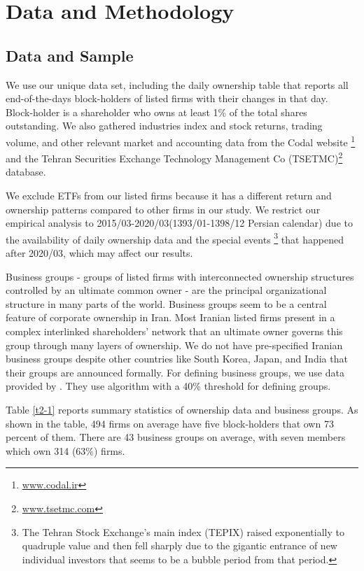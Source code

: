 
\section{{Data and Methodology}}



\subsection{{Data and Sample}}


We  use our unique data set, including the daily ownership table that reports all end-of-the-days block-holders of listed firms with their changes in that day.  Block-holder is a shareholder who owns at least 1\% of the total shares outstanding. 
	We also gathered industries index and stock returns, trading volume, and other relevant market and accounting data from the Codal website \footnote{\href{http://www.codal.ir}{www.codal.ir}}
and the  Tehran Securities Exchange Technology Management Co (TSETMC)\footnote{\href{http://www.tsetmc.com}{www.tsetmc.com}} database.

We exclude ETFs from our listed firms because it has a different return and ownership patterns compared to other firms in our study.
We restrict our empirical analysis to 2015/03-2020/03(1393/01-1398/12 Persian calendar) due to the availability of daily ownership data and the special events \footnote{
	The Tehran Stock Exchange's main index (TEPIX) raised exponentially to quadruple value and then fell sharply due to the gigantic entrance of new individual investors that seems to be a bubble period from that period.} that happened after 2020/03, which may affect our results. 

Business groups - groups of listed firms with interconnected ownership structures controlled by an ultimate common owner - are the principal organizational structure in many parts of the world.
Business groups seem to be a central feature of corporate ownership in Iran. 
Most Iranian listed firms present in a complex interlinked shareholders' network that an ultimate owner governs this group through many layers of ownership.{\cite{Aliabadi2022}}  
We do not have pre-specified Iranian business groups despite other countries like South Korea, Japan, and India that their groups are announced formally.
For defining business groups, we use data provided by {\cite{Aliabadi2022}}.
They use \cite{almeida2011structure} algorithm with a 40\% threshold for defining groups. 


Table \ref{t2-1} reports summary statistics of ownership data and business groups. As shown in the table, 494 firms on average have five block-holders that own 73 percent of them. There are 43 business groups on average, with seven members which own 314 (63\%) firms. 

